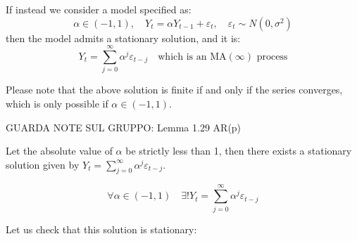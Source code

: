         \begin{example}[\(|\alpha| < 1\)]
            If instead we consider a model specified as:
            \[
            \alpha \in (-1, 1), \quad Y_t = \alpha Y_{t-1} + \varepsilon_t, \quad \varepsilon_t \sim N(0, \sigma^2)
            \]
            then the model admits a stationary solution, and it is:
            \[
            Y_t = \sum_{j=0}^{\infty} \alpha^j \varepsilon_{t-j} \quad \text{which is an MA}(\infty) \text{ process}
            \]
        \end{example}

        \begin{remark}
            Please note that the above solution is finite if and only if the series converges, which is only possible if \(\alpha \in (-1, 1)\).
        \end{remark}

        GUARDA NOTE SUL GRUPPO: Lemma 1.29 AR(p)

        Let the absolute value of \(\alpha\) be strictly less than 1, then there exists a stationary solution given by \( Y_t = \sum_{j=0}^{\infty} \alpha^j \varepsilon_{t-j} \).

        \begin{equation}
            \forall \alpha \in (-1,1) \quad  \exists ! Y_t = \sum_{j=0}^{\infty} \alpha^j \varepsilon_{t-j}
        \end{equation}



        Let us check that this solution is stationary:


